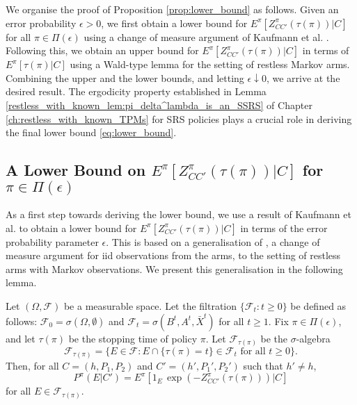 We organise the proof of Proposition \ref{prop:lower_bound} as follows. Given an error probability $\epsilon>0$, we first obtain a lower bound for $E^\pi[Z^\pi_{CC'}(\tau(\pi))|C]$ for all $\pi\in\Pi(\epsilon)$ using a change of measure argument of Kaufmann et al. \cite{Kaufmann2016}. Following this, we obtain an upper bound for $E^\pi[Z^\pi_{CC'}(\tau(\pi))|C]$ in terms of $E^\pi[\tau(\pi)|C]$ using a Wald-type lemma for the setting of restless Markov arms. Combining the upper and the lower bounds, and letting $\epsilon\downarrow 0$, we arrive at the desired result. The ergodicity property established in Lemma \ref{restless_with_known_lem:pi_delta^lambda_is_an_SSRS} of Chapter \ref{ch:restless_with_known_TPMs} for SRS policies plays a crucial role in deriving the final lower bound \eqref{eq:lower_bound}.



\subsection{A Lower Bound on $E^\pi[Z^\pi_{CC'}(\tau(\pi))|C]$ for $\pi\in\Pi(\epsilon)$}
As a first step towards deriving the lower bound, we use a result of Kaufmann et al. \cite{Kaufmann2016} to obtain a lower bound for $E^\pi[Z^\pi_{CC'}(\tau(\pi))|C]$ in terms of the error probability parameter $\epsilon$. This is based on a generalisation of \cite[Lemma 18]{Kaufmann2016}, a change of measure argument for iid observations from the arms, to the setting of restless arms with Markov observations. We present this generalisation in the following lemma.

\begin{lemma}\label{lem:change_of_measure}
	Let $(\Omega, \mathcal{F})$ be a measurable space. Let the filtration $\{\mathcal{F}_t:t\geq 0\}$ be defined as follows: $\mathcal{F}_0=\sigma(\Omega, \emptyset)$ and $\mathcal{F}_t=\sigma(B^t,A^t,\bar{X}^t)$ for all $t\geq 1$. Fix $\pi\in\Pi(\epsilon)$, and let $\tau(\pi)$ be the stopping time of policy $\pi$. Let $\mathcal{F}_{\tau(\pi)}$ be the $\sigma$-algebra
	\begin{equation}
		\mathcal{F}_{\tau(\pi)}=\{E\in\mathcal{F}:E\cap \{\tau(\pi)= t\}\in\mathcal{F}_t\text{ for all }t\geq 0\}.\label{eq:F_tau}
	\end{equation}
Then, for all $C=(h, P_1, P_2)$ and $C'=(h', P_1', P_2')$ such that $h' \neq h$,
	\begin{equation}
		P^\pi(E|C')=E^\pi[1_{E}\,\exp(-Z^\pi_{CC'}(\tau(\pi)))|C]\label{eq:change_of_measure}
	\end{equation}
	for all $E\in\mathcal{F}_{\tau(\pi)}$.
\end{lemma}

